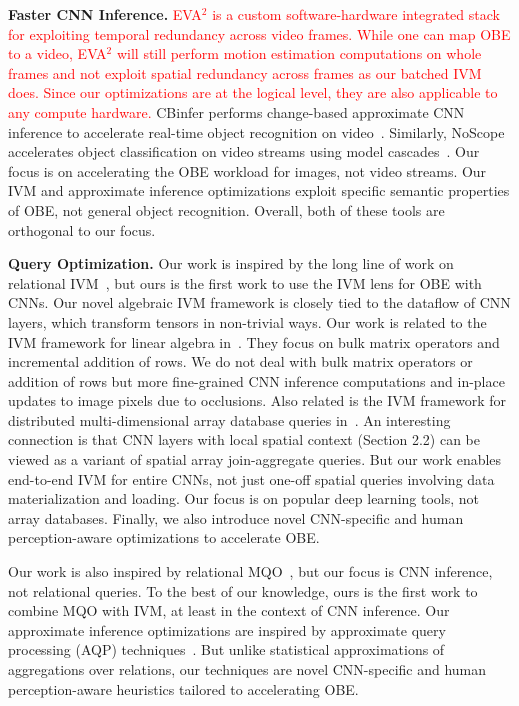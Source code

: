 \documentclass[10pt, sigconf]{acmart}
\newcommand{\red}{\textcolor{red}}
\begin{document}
\vspace{2mm}
\noindent \textbf{Faster CNN Inference.} 
\red{EVA$^2$ \cite{buckler2018eva} is a custom software-hardware integrated stack for exploiting temporal redundancy across video frames. While one can map OBE to a video, EVA$^2$ will still perform motion estimation computations on whole frames and not exploit spatial redundancy across frames as our batched IVM does. Since our optimizations are at the logical level, they are also applicable to any compute hardware.}
CBinfer performs change-based approximate CNN inference to accelerate real-time object recognition on video~\cite{cavigelli2017cbinfer}. Similarly, NoScope accelerates object classification on video streams using model cascades~\cite{kang2017noscope}. Our focus is on accelerating the OBE workload for images, not video streams. Our IVM and approximate inference optimizations exploit specific semantic properties of OBE, not general object recognition. Overall, both of these tools are orthogonal to our focus.


\vspace{2mm}
\noindent \textbf{Query Optimization.}
Our work is inspired by the long line of work on relational IVM~\cite{chirkova2012materialized, gupta1995maintenance, levy1995answering}, but ours is the first work to use the IVM lens for OBE with CNNs. Our novel algebraic IVM framework is closely tied to the dataflow of CNN layers, which transform tensors in non-trivial ways. Our work is related to the IVM framework for linear algebra in~\cite{nikolic2014linview}. They focus on bulk matrix operators and incremental addition of rows. We do not deal with bulk matrix operators or addition of rows but more fine-grained CNN inference computations and in-place updates to image pixels due to occlusions. Also related is the IVM framework for distributed multi-dimensional array database queries in~\cite{zhao2017incremental}. An interesting connection is that CNN layers with local spatial context (Section 2.2) can be viewed as a variant of spatial array join-aggregate queries. But our work enables end-to-end IVM for entire CNNs, not just one-off spatial queries involving data materialization and loading. Our focus is on popular deep learning tools, not array databases. Finally, we also introduce novel CNN-specific and human perception-aware optimizations to accelerate OBE.

Our work is also inspired by relational MQO~\cite{sellis1988multiple,le2012scalable}, but our focus is CNN inference, not relational queries. To the best of our knowledge, ours is the first work to combine MQO with IVM, at least in the context of CNN inference. Our approximate inference optimizations are inspired by approximate query processing (AQP) techniques~\cite{garofalakis2001approximate}. But unlike statistical approximations of aggregations over relations, our techniques are novel CNN-specific and human perception-aware heuristics tailored to accelerating OBE.
\end{document}
